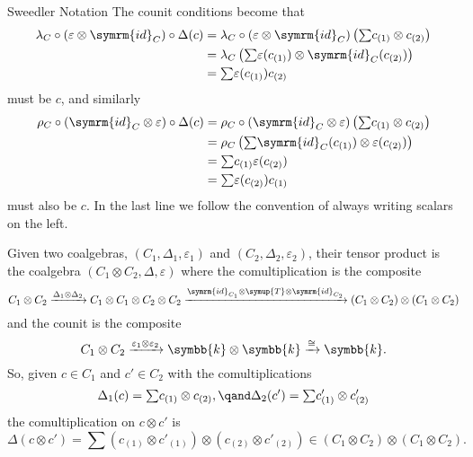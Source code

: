\documentclass[fleqn]{NotesClass}
\newcommand{\switch}{\symup{T}}
\newcommand{\id}{\symrm{id}}
\newcommand{\isomorphic}{\cong}
\renewcommand{\field}{\symbb{k}}
\newcommand{\tsum}{{\textstyle \sum}}
\begin{document}
\begin{ntn}{Sweedler Notation}{}
        The counit conditions become that
        \begin{align}
            \lambda_C \circ (\varepsilon \otimes \id_C) \circ \Delta(c) &= \lambda_C \circ (\varepsilon \otimes \id_C) \left( \tsum c_{(1)} \otimes c_{(2)} \right)\\
            &= \lambda_C \left( \tsum \varepsilon(c_{(1)}) \otimes \id_C(c_{(2)}) \right)\\
            &= \tsum \varepsilon(c_{(1)}) c_{(2)}
        \end{align}
        must be \(c\), and similarly
        \begin{align}
            \rho_C \circ (\id_C \otimes \varepsilon) \circ \Delta(c) &= \rho_C \circ (\id_C \otimes \varepsilon) \left( \tsum c_{(1)} \otimes c_{(2)} \right)\\
            &= \rho_C \left( \tsum \id_C(c_{(1)}) \otimes \varepsilon(c_{(2)}) \right)\\
            &= \tsum c_{(1)} \varepsilon(c_{(2)})\\
            &= \tsum \varepsilon(c_{(2)}) c_{(1)}
        \end{align}
        must also be \(c\).
        In the last line we follow the convention of always writing scalars on the left.
    \end{ntn}
    
    Given two coalgebras, \((C_1, \Delta_1, \varepsilon_1)\) and \((C_2, \Delta_2, \varepsilon_2)\), their tensor product is the coalgebra \((C_1 \otimes C_2, \Delta, \varepsilon)\) where the comultiplication is the composite
    \begin{equation}
        C_1 \otimes C_2 \xrightarrow{\Delta_1 \otimes \Delta_2} C_1 \otimes C_1 \otimes C_2 \otimes C_2 \xrightarrow{\id_{C_1} \otimes \switch \otimes \id_{C_2}} (C_1 \otimes C_2) \otimes (C_1 \otimes C_2)
    \end{equation}
    and the counit is the composite
    \begin{equation}
        C_1 \otimes C_2 \xrightarrow{\varepsilon_1 \otimes \varepsilon_2} \field \otimes \field \xrightarrow{\isomorphic} \field.
    \end{equation}
    So, given \(c \in C_1\) and \(c' \in C_2\) with the comultiplications
    \begin{equation}
        \Delta_1(c) = \tsum c_{(1)} \otimes c_{(2)}, \qand \Delta_2(c') = \tsum c_{(1)}' \otimes c_{(2)}'
    \end{equation}
    the comultiplication on \(c \otimes c'\) is
    \begin{equation}
        \Delta(c \otimes c') = \tsum (c_{(1)} \otimes c'_{(1)}) \otimes (c_{(2)} \otimes c'_{(2)}) \in (C_1 \otimes C_2) \otimes (C_1 \otimes C_2).
    \end{equation}
    
\end{document}
